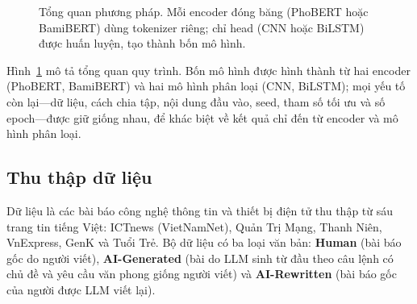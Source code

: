 \documentclass[conference,a4paper]{IEEEtran}
\begin{document}
\begin{figure}[t]
{}
  \caption{Tổng quan phương pháp. Mỗi encoder đóng băng (PhoBERT hoặc BamiBERT) dùng tokenizer riêng; chỉ head (CNN hoặc BiLSTM) được huấn luyện, tạo thành bốn mô hình.}
  \label{fig:overview}
\end{figure}

Hình~\ref{fig:overview} mô tả tổng quan quy trình. Bốn mô hình được hình thành từ hai encoder (PhoBERT, BamiBERT) và hai mô hình phân loại (CNN, BiLSTM); mọi yếu tố còn lại---dữ liệu, cách chia tập, nội dung đầu vào, seed, tham số tối ưu và số epoch---được giữ giống nhau, để khác biệt về kết quả chỉ đến từ encoder và mô hình phân loại.

\subsection{Thu thập dữ liệu}
Dữ liệu là các bài báo công nghệ thông tin và thiết bị điện tử thu thập từ sáu trang tin tiếng Việt: ICTnews (VietNamNet), Quản Trị Mạng, Thanh Niên, VnExpress, GenK và Tuổi Trẻ. Bộ dữ liệu có ba loại văn bản: \textbf{Human} (bài báo gốc do người viết), \textbf{AI-Generated} (bài do LLM sinh từ đầu theo câu lệnh có chủ đề và yêu cầu văn phong giống người viết) và \textbf{AI-Rewritten} (bài báo gốc của người được LLM viết lại).
\end{document}
